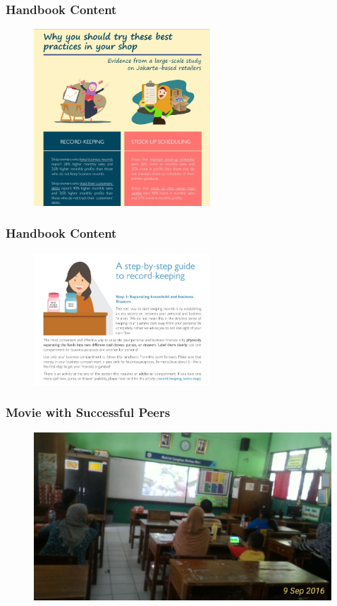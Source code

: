 \documentclass[hideothersubsections, usenames,dvipsnames,11pt]{beamer}
\begin{document}
\begin{frame}
\frametitle{Handbook Content}
\begin{figure}[htbp]
	\centering
		\includegraphics[width=2.6in]{pics/Handbook_return.jpg}
	
	\label{height}
\end{figure}
\end{frame}


\begin{frame}
\frametitle{Handbook Content}

\begin{figure}[htbp]
	\centering
		\includegraphics[width=2.6in]{pics/Handbook_stepbystep.jpg}
	
	\label{height}
\end{figure}
\end{frame}

\begin{frame}
\frametitle{Movie with Successful Peers}
\begin{figure}[htbp]
	\centering
		\includegraphics[width=4.4in]{pics/movie.jpg}
   
	\label{height}
\end{figure}
\end{frame}
\end{document}
